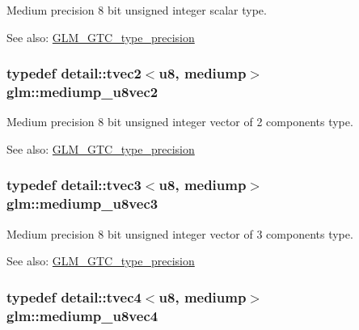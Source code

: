 Medium precision 8 bit unsigned integer scalar type. \begin{Desc}
\item[See also:]\hyperlink{group__gtc__type__precision}{GLM\_\-GTC\_\-type\_\-precision} \end{Desc}
\hypertarget{group__gtc__type__precision_g5e20c1315bc1fecc867bc74525bea2ab}{
\subsubsection[mediump\_\-u8vec2]{\setlength{\rightskip}{0pt plus 5cm}typedef detail::tvec2$<$u8, mediump$>$ {\bf glm::mediump\_\-u8vec2}}}
\label{group__gtc__type__precision_g5e20c1315bc1fecc867bc74525bea2ab}


Medium precision 8 bit unsigned integer vector of 2 components type. \begin{Desc}
\item[See also:]\hyperlink{group__gtc__type__precision}{GLM\_\-GTC\_\-type\_\-precision} \end{Desc}
\hypertarget{group__gtc__type__precision_g58f79eee840b2838443292c50ddb2919}{
\subsubsection[mediump\_\-u8vec3]{\setlength{\rightskip}{0pt plus 5cm}typedef detail::tvec3$<$u8, mediump$>$ {\bf glm::mediump\_\-u8vec3}}}
\label{group__gtc__type__precision_g58f79eee840b2838443292c50ddb2919}


Medium precision 8 bit unsigned integer vector of 3 components type. \begin{Desc}
\item[See also:]\hyperlink{group__gtc__type__precision}{GLM\_\-GTC\_\-type\_\-precision} \end{Desc}
\hypertarget{group__gtc__type__precision_g407b5aa9a3fd6d344b70fa6ce2ce92d4}{
\subsubsection[mediump\_\-u8vec4]{\setlength{\rightskip}{0pt plus 5cm}typedef detail::tvec4$<$u8, mediump$>$ {\bf glm::mediump\_\-u8vec4}}}
\label{group__gtc__type__precision_g407b5aa9a3fd6d344b70fa6ce2ce92d4}



